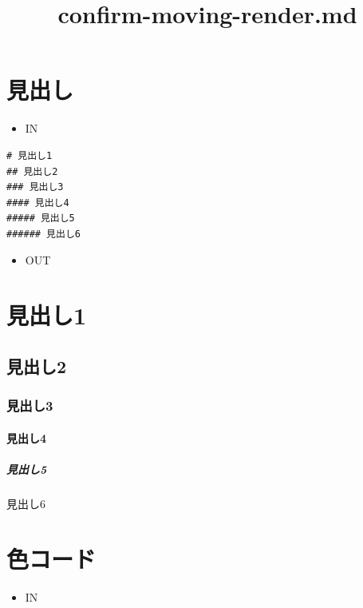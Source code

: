 \documentclass[]{article}
\title{confirm-moving-render.md}
\date{}
\let\oldparagraph\paragraph
\renewcommand{\paragraph}[1]{\oldparagraph{#1}\mbox{}}
\let\oldsubparagraph\subparagraph
\renewcommand{\subparagraph}[1]{\oldsubparagraph{#1}\mbox{}}
\begin{document}
\maketitle

\section{見出し}\label{header-n219}

\begin{itemize}
\item
  IN
\end{itemize}

\begin{verbatim}
# 見出し1
## 見出し2
### 見出し3
#### 見出し4
##### 見出し5
###### 見出し6
\end{verbatim}

\begin{itemize}
\item
  OUT
\end{itemize}

\section{見出し1}\label{header-n228}

\subsection{見出し2}\label{header-n229}

\subsubsection{見出し3}\label{header-n230}

\paragraph{見出し4}\label{header-n231}

\subparagraph{見出し5}\label{header-n232}

見出し6

\section{色コード}\label{header-n235}

\begin{itemize}
\item
  IN
\end{itemize}
\end{document}
